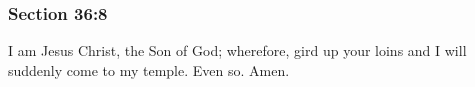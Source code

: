 
	\subsubsection{Section 36:8} %
		\label{DC36-8}

		I am Jesus Christ, the Son of God; wherefore, gird up your loins and I will suddenly come to my temple. Even so. Amen.

